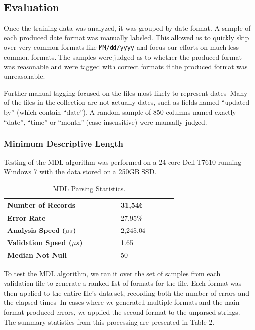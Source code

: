 \subsection{Evaluation}
Once the training data was analyzed, it was grouped by date format. A sample of each produced date format was manually labeled. This allowed us to quickly skip over very common formats like \texttt{MM/dd/yyyy} and focus our efforts on much less common formats. The samples were judged as to whether the produced format was reasonable and were tagged with correct formats if the produced format was unreasonable.

Further manual tagging focused on the files most likely to represent dates. Many of the files in the collection are not actually dates, such as fields named ``updated by'' (which contain ``date''). A random sample of 850 columns named exactly ``date'', ``time'' or ``month'' (case-insensitive) were manually judged.\\

\subsubsection{Minimum Descriptive Length}
Testing of the MDL algorithm was performed on a 24-core Dell T7610 running Windows 7 with the data stored on a 250GB SSD.


\begin{table}[ht]
\centering
\begin{tabular}{|p{0.48\linewidth}| p{0.24\linewidth}|}
\hline
\textbf{Number of Records} & 31,546\\ \hline
\textbf{Error Rate} & 27.95\% \\ \hline
\textbf{Analysis Speed ($\mu s$)} & 2,245.04 \\ \hline
\textbf{Validation Speed ($\mu s$)} & 1.65 \\ \hline
\textbf{Median Not Null} & 50 \\ \hline
\end{tabular}
\label{tab:mdlstats}
\caption{MDL Parsing Statistics.}
\end{table}



To test the MDL algorithm, we ran it over the set of samples from each validation file to generate a ranked list of formats for the file. Each format was then applied to the entire file's data set, recording both the number of errors and the elapsed times. In cases where we generated multiple formats and the main format produced errors, we applied the second format to the unparsed strings. The summary statistics from this processing are presented in Table 2.

